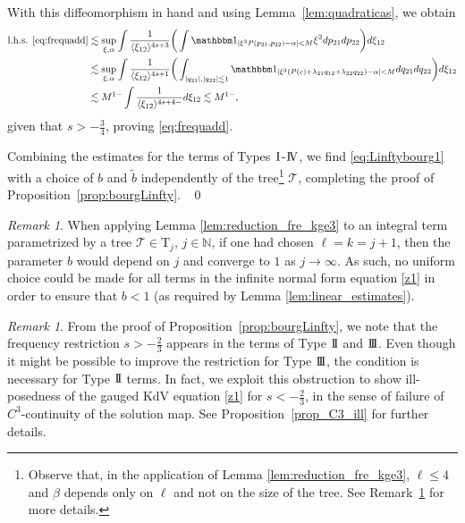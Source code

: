 \documentclass[a4paper,
11pt,  reqno]{amsart}
\newcommand{\I}{\hspace{0.2mm}\textup{I}\hspace{0.2mm}}
\newcommand{\II}{\textup{I \hspace{-2.9mm} I} }
\newcommand{\III}{\textup{I \hspace{-2.9mm} I \hspace{-2.9mm} I}}
\newcommand{\IV}{\textup{I \hspace{-2.9mm} V}}
\newcommand{\5}{\textup{V}}
\newcommand{\ind}{\mathbbm 1}
\newcommand{\les}{\lesssim}
\newcommand{\wt}{\widetilde}
\theoremstyle{remark}
\newtheorem{remark}[theorem]{Remark}
\newcommand{\TT}{\mathcal{T}}
\newcommand{\Tr}{\mathrm{T}}
\newcommand{\al}{\alpha}
\newcommand{\ld}{\lambda}
\newcommand{\jb}[1]
{\langle #1 \rangle}
\newcommand{\N}{\mathbb{N}}
\numberwithin{equation}{section}
\numberwithin{theorem}{section}
\begin{document}
With this diffeomorphism in hand and using Lemma~\ref{lem:quadraticas}, we obtain
\begin{align}
\text{l.h.s. } \eqref{eq:frequadd}
&
\les 
\sup_{\xi, \al}
\int \frac{ 1 }{ \jb{\xi_{12}}^{4s+3} } 
\bigg( 
\int \ind_{|\xi^3 P( p_{21}, p_{22}) - \al| < M } \xi^2 dp_{21} dp_{22} 
\bigg)
d\xi_{12}
\\
&
\les 
\sup_{\xi, \al}
\int \frac{1}{\jb{\xi_{12}}^{4s+1}} 
\bigg( 
\int_{|q_{21}| ,  |q_{22}| \les 1} 
\ind_{|\xi^3 (P(c) + \ld_{21} q_{12} + \ld_{22} q_{22}) - \al| < M  } 
d q_{21} dq_{22}
\bigg) 
d\xi_{12}
\\
&
\les M^{1-} \int \frac{1}{\jb{\xi_{12}}^{4s+4-}} d \xi_{12}
\les M^{1-},
\end{align}
given that $s> -\frac34$, proving \eqref{eq:frequadd}.

\smallskip 

Combining the estimates for the terms of Types $\I$-$\IV$, we find \eqref{eq:Linftybourg1} with a choice of $b$ and $\wt{b}$ independently of the tree\footnote{Observe that, in the application of Lemma \ref{lem:reduction_fre_kge3}, $\ell\le 4$ and $\beta$ depends only on $\ell$ and not on the size of the tree. See Remark~\ref{REM:b} for more details.} $\TT$,  completing the proof of Proposition~\ref{prop:bourgLinfty}. ~\qed

\bigskip 


\begin{remark}\rm 
\label{REM:b}
    When applying Lemma \ref{lem:reduction_fre_kge3} to an integral term parametrized by a tree $\TT\in \Tr_j$, $j\in\N$, if one had chosen $\ell=k = j+1$, then the parameter $b$ would depend on $j$ and converge to $1$  as $j\to \infty$. As such, no uniform choice could be made for all terms in the infinite normal form equation \eqref{z1} in order to ensure that $b<1$ (as required by Lemma \ref{lem:linear_estimates}).
\end{remark}



\begin{remark}
\rm 


From the proof of Proposition~\ref{prop:bourgLinfty}, we note that the frequency restriction $s> -\frac23$ appears in the terms of Type $\II$ and $\III$. Even though it might be possible to improve the restriction for Type $\III$, the condition is necessary for Type $\II$ terms.
In fact, 
we exploit this obstruction to show ill-posedness of the gauged KdV equation \eqref{z1} 
for $s<-\frac23$, in the sense of failure of $C^3$-continuity of the solution map. See Proposition~\ref{prop_C3_ill} for further details. 

\end{remark}
\end{document}
